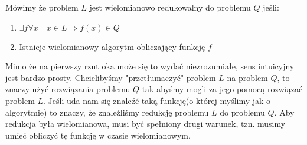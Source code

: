 \begin{definition}
Mówimy że problem $L$ jest wielomianowo redukowalny do problemu $Q$ jeśli:
\begin{enumerate}
\item $\exists f \forall x \quad  x \in L \Rightarrow f(x) \in Q$
\item Istnieje wielomianowy algorytm obliczający funkcję $f$
\end{enumerate}
\end{definition}
\noindent
Mimo że na pierwszy rzut oka może się to wydać niezrozumiałe, sens intuicyjny jest bardzo prosty. 
Chcielibyśmy "przetłumaczyć" problem $L$ na problem $Q$, to znaczy użyć rozwiązania problemu $Q$ tak abyśmy mogli za jego pomocą rozwiązać problem $L$. 
Jeśli uda nam się znaleźć taką funkcję(o której myślimy jak o algorytmie) to znaczy, że znaleźliśmy redukcję problemu $L$ do problemu $Q$. 
Aby redukcja była wielomianowa, musi być spełniony drugi warunek, tzn. musimy umieć obliczyć tę funkcję w czasie wielomianowym.

